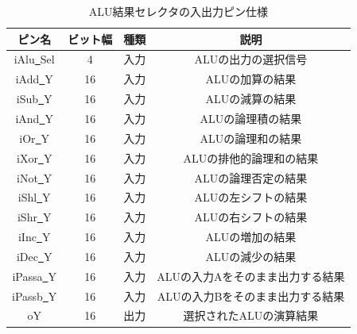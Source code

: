 \documentclass[a4paper,11pt]{ltjsarticle}
\begin{document}
\begin{table}[H]
    \centering
    \caption{ALU結果セレクタの入出力ピン仕様}
    \label{tab:alu_sel}
    \begin{tabular}{|c|c|c|c|}
        \hline
        ピン名                  & ビット幅 & 種類 & 説明                 \\
        \hline
        iAlu\underline{~}Sel & 4    & 入力 & ALUの出力の選択信号        \\
        \hline
        iAdd\underline{~}Y   & 16   & 入力 & ALUの加算の結果          \\
        \hline
        iSub\underline{~}Y   & 16   & 入力 & ALUの減算の結果          \\
        \hline
        iAnd\underline{~}Y   & 16   & 入力 & ALUの論理積の結果         \\
        \hline
        iOr\underline{~}Y    & 16   & 入力 & ALUの論理和の結果         \\
        \hline
        iXor\underline{~}Y   & 16   & 入力 & ALUの排他的論理和の結果      \\
        \hline
        iNot\underline{~}Y   & 16   & 入力 & ALUの論理否定の結果        \\
        \hline
        iShl\underline{~}Y   & 16   & 入力 & ALUの左シフトの結果        \\
        \hline
        iShr\underline{~}Y   & 16   & 入力 & ALUの右シフトの結果        \\
        \hline
        iInc\underline{~}Y   & 16   & 入力 & ALUの増加の結果          \\
        \hline
        iDec\underline{~}Y   & 16   & 入力 & ALUの減少の結果          \\
        \hline
        iPassa\underline{~}Y & 16   & 入力 & ALUの入力Aをそのまま出力する結果 \\
        \hline
        iPassb\underline{~}Y & 16   & 入力 & ALUの入力Bをそのまま出力する結果 \\
        \hline
        oY                   & 16   & 出力 & 選択されたALUの演算結果      \\
        \hline
    \end{tabular}
\end{table}
\end{document}
